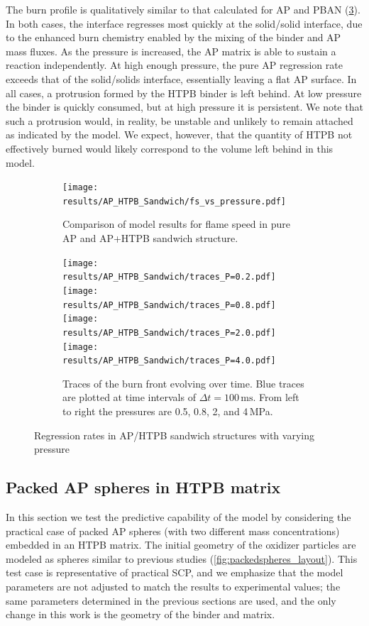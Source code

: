 \documentclass[colorinlistoftodos,review]{elsarticle}
\begin{document}
The burn profile is qualitatively similar to that calculated for AP and PBAN (\cref{fig:sandwich AP/HTPB propagation}).
In both cases, the interface regresses most quickly at the solid\slash solid interface, due to the enhanced burn chemistry enabled by the mixing of the binder and AP mass fluxes.
As the pressure is increased, the AP matrix is able to sustain a reaction independently.
At high enough pressure, the pure AP regression rate exceeds that of the solid\slash solids interface, essentially leaving a flat AP surface.
In all cases, a protrusion formed by the HTPB binder is left behind. 
At low pressure the binder is quickly consumed, but at high pressure it is persistent.
We note that such a protrusion would, in reality, be unstable and unlikely to remain attached as indicated by the model.
We expect, however, that the quantity of HTPB not effectively burned would likely correspond to the volume left behind in this model.

\begin{figure}
  \begin{subfigure}{0.55\linewidth}
    \texttt{[image: results/AP\_HTPB\_Sandwich/fs\_vs\_pressure.pdf]}
    \caption{Comparison of model results for flame speed in pure AP and AP+HTPB sandwich structure.}
    \label{fig:sandwich_AP_HTPB_plot}
  \end{subfigure}\hfill%
  \begin{subfigure}{0.4\linewidth}
    \texttt{[image: results/AP\_HTPB\_Sandwich/traces\_P=0.2.pdf]}%
    \texttt{[image: results/AP\_HTPB\_Sandwich/traces\_P=0.8.pdf]}%
    \texttt{[image: results/AP\_HTPB\_Sandwich/traces\_P=2.0.pdf]}%
    \texttt{[image: results/AP\_HTPB\_Sandwich/traces\_P=4.0.pdf]}
    \caption{Traces of the burn front evolving over time. Blue traces are plotted at time intervals of $\Delta t = 100\,\mathrm{ms}$. From left to right the pressures are 0.5, 0.8, 2, and 4\,MPa.}
    \label{fig:sandwich AP/HTPB propagation}
  \end{subfigure}
  \caption{Regression rates in AP/HTPB sandwich structures with varying pressure}
\end{figure}

\subsection{Packed AP spheres in HTPB matrix}

In this section we test the predictive capability of the model by considering the practical case of packed AP spheres (with two different mass concentrations) embedded in an HTPB matrix.
The initial geometry of the oxidizer particles are modeled as spheres similar to previous studies (\cref{fig:packedspheres_layout}). 
This test case is representative of practical SCP, and we emphasize that the model parameters are not adjusted to match the results to experimental values; the same parameters determined in the previous sections are used, and the only change in this work is the geometry of the binder and matrix.
\end{document}
